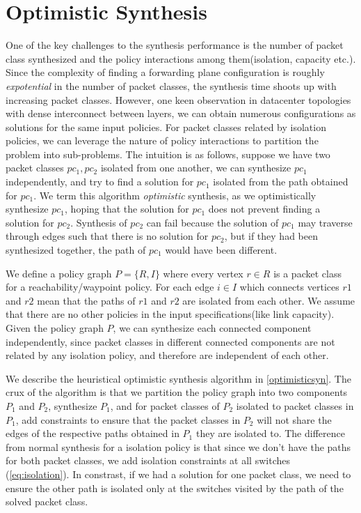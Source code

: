 \section{Optimistic Synthesis} \label{sec:optimistic}
One of the key challenges to the synthesis performance is the number of packet class synthesized and the policy interactions among them(isolation, capacity etc.). Since the complexity of finding a forwarding plane configuration is roughly \emph{expotential} in the number of packet classes, the synthesis time shoots up with increasing packet classes. 
However, one keen observation in datacenter topologies with dense interconnect between layers, we can obtain numerous configurations as solutions for the same input policies. For packet classes related by isolation policies, we can leverage the nature of policy interactions to  partition the problem into sub-problems. 
The intuition is as follows, suppose we have two packet classes $pc_1, pc_2$ isolated from one another, we can synthesize $pc_1$ independently, and try to find a solution for $pc_1$ isolated from the path obtained for $pc_1$. We term this algorithm \emph{optimistic} synthesis, as we optimistically synthesize $pc_1$, hoping that the solution for $pc_1$ does not prevent finding a solution for $pc_2$. Synthesis of $pc_2$ can fail because the solution of $pc_1$ may traverse through edges such that there is no solution for $pc_2$, but if they had been synthesized together, the path of $pc_1$ would have been different.  

We define a policy graph $P = \{R, I\}$ where every vertex $r \in R$ is a packet class for a reachability/waypoint policy. For each edge $i \in I$ which connects vertices $r1$ and $r2$ mean that the paths of $r1$ and $r2$ are isolated from each other. We assume that there are no other policies in the input specifications(like link capacity). Given the policy graph $P$, we can synthesize each connected component independently, since packet classes in different connected components are not related by any isolation policy, and therefore are independent of each other.  

We describe the heuristical optimistic synthesis algorithm in \cref{optimisticsyn}. The crux of the algorithm is that we partition the policy graph into two components $P_1$ and $P_2$, synthesize $P_1$, and for packet classes of $P_2$ isolated to packet classes in $P_1$, add constraints to ensure that the packet classes in $P_2$ will not share the edges of the respective paths obtained in $P_1$ they are isolated to. The difference from normal synthesis for a isolation policy is that since we don't have the paths for both packet classes, we add isolation constraints at all switches (\cref{eq:isolation}). In constrast, if we had a solution for one packet class, we need to ensure the other path is isolated only at the switches visited by the path of the solved packet class. 

